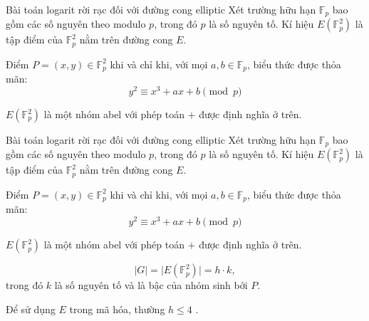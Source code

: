 \documentclass [xcolor=svgnames, t] {beamer}
\theoremstyle{definition}
\begin{document}
\begin{frame}{Bài toán logarit rời rạc đối với đường cong elliptic}
    Xét trường hữu hạn $\mathbb{F}_p$ bao gồm các số nguyên theo modulo $p$, trong đó $p$ là số nguyên tố.
    Kí hiệu $E(\mathbb{F}^2_p)$ là tập điểm của $\mathbb{F}^2_p$ nằm trên đường cong $E$.

    Điểm $P=(x,y) \in \mathbb{F}_p^2$ khi và chỉ khi, với mọi $a,b \in \mathbb{F}_p$, biểu thức được thỏa mãn:
    \begin{equation}
        \label{equation:3.8}
        y^2 \equiv x^3 + ax + b \pmod{p}
    \end{equation}

    $E(\mathbb{F}^2_p)$ là một nhóm abel với phép toán $+$ được định nghĩa ở trên.


\end{frame}
\begin{frame}{Bài toán logarit rời rạc đối với đường cong elliptic}
    Xét trường hữu hạn $\mathbb{F}_p$ bao gồm các số nguyên theo modulo $p$, trong đó $p$ là số nguyên tố.
    Kí hiệu $E(\mathbb{F}^2_p)$ là tập điểm của $\mathbb{F}^2_p$ nằm trên đường cong $E$.

    Điểm $P=(x,y) \in \mathbb{F}_p^2$ khi và chỉ khi, với mọi $a,b \in \mathbb{F}_p$, biểu thức được thỏa mãn:
    \begin{equation}
        y^2 \equiv x^3 + ax + b \pmod{p}
    \end{equation}

    $E(\mathbb{F}^2_p)$ là một nhóm abel với phép toán $+$ được định nghĩa ở trên.

    $$ \mid G \mid = \mid E(\mathbb{F}^2_p) \mid = h \cdot k,$$
    trong đó $k$ là số nguyên tố và là bậc của nhóm sinh bới $P$.

    Để sử dụng $E$ trong mã hóa, thường $h \leq 4$ .
\end{frame}
\end{document}
